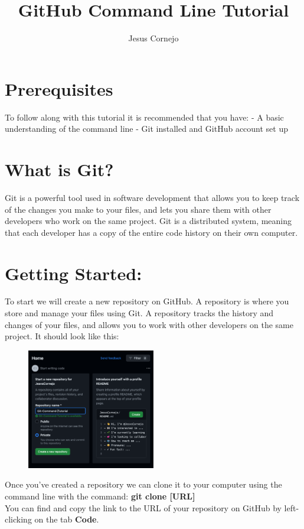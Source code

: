 \documentclass[10pt,twocolumn]{article}
\title{GitHub Command Line Tutorial}
\author{Jesus Cornejo}
\affiliation{Occidental College}
\begin{document}
\maketitle
\section{Prerequisites}
To follow along with this tutorial it is recommended that you have:
- A basic understanding of the command line
- Git installed and GitHub account set up
\section{What is Git?}
Git is a powerful tool used in software development that allows you to keep track of the changes you make to your files, and lets you share them with other developers who work on the same project. Git is a distributed system, meaning that each developer has a copy of the entire code history on their own computer. 
\section{Getting Started:}
To start we will create a new repository on GitHub.
A repository is where you store and manage your files using Git. A repository tracks the history and changes of your files, and allows you to work with other developers on the same project.
It should look like this: 

\begin{figure}[h!]
\center
\includegraphics[width=0.5\textwidth]{screenshots/sc1.png}
\end{figure}

Once you've created a repository we can clone it to your computer using the command line with the command:  \textbf{git clone [URL]}\\
You can find and copy the link to the URL of your repository on GitHub by left-clicking on the tab \textbf{Code}.\\
\end{document}
